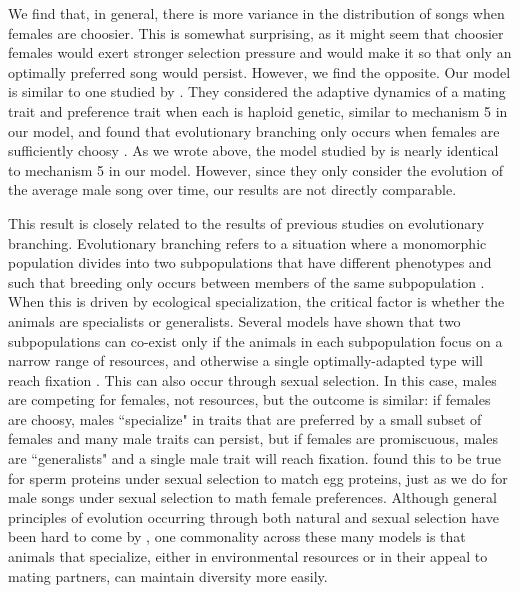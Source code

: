 \documentclass[12pt]{article}
\begin{document}
We find that, in general, there is more variance in the distribution of songs when females are choosier. This is somewhat surprising, as it might seem that choosier females would exert stronger selection pressure and would make it so that only an optimally preferred song would persist. However, we find the opposite. Our model is similar to one studied by  \citet{Doorn:2000nx}. They considered the adaptive dynamics of a mating trait and preference trait when each is haploid genetic, similar to mechanism 5 in our model, and found that evolutionary branching only occurs when females are sufficiently choosy \cite{Doorn:2000nx}. 
As we wrote above, the model studied by \citet{Aoki:2001ly} is nearly identical to mechanism 5 in our model. However, since they only consider the evolution of the average male song over time, our results are not directly comparable.  
 
This result is closely related to the results of previous studies on evolutionary branching. Evolutionary branching refers to a situation where a monomorphic population divides into two subpopulations that have different phenotypes and such that breeding only occurs between members of the same subpopulation \cite{Doebeli:2000oq,Doorn:2000nx,Weissing:2011hc}. When this is driven by ecological specialization, the critical factor is whether the animals are specialists or generalists. Several models have shown that two subpopulations can co-exist only if the animals in each subpopulation focus on a narrow range of resources, and otherwise a single optimally-adapted type will reach fixation \cite{Doebeli:2000oq,Doorn:2000nx,Weissing:2011hc}. This can also occur through sexual selection. In this case, males are competing for females, not resources, but the outcome is similar: if females are choosy, males ``specialize" in traits that are preferred by a small subset of females and many male traits can persist, but if females are promiscuous, males are ``generalists" and a single male trait will reach fixation. \citet{Van-Doorn:2001fv} found this to be true for sperm proteins under sexual selection to match egg proteins, just as we do for male songs under sexual selection to math female preferences. Although general principles of evolution occurring through both natural and sexual selection have been hard to come by \cite{Kirkpatrick:2002fu}, one commonality across these many models is that animals that specialize, either in environmental resources or in their appeal to mating partners, can maintain diversity more easily.
\end{document}
